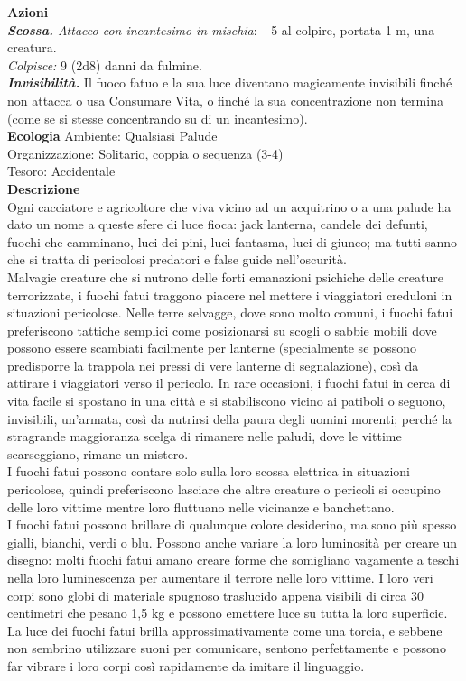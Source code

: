 \begin{multicols}{2}
\smallskip\textbf{Azioni}\\
\emph{\textbf{Scossa.} Attacco con incantesimo in mischia}: +5 al colpire, portata 1 m, una creatura.\\
\emph{Colpisce:} 9 (2d8) danni da fulmine.\\
\emph{\textbf{Invisibilità.}} Il fuoco fatuo e la sua luce diventano magicamente invisibili finché non attacca o usa Consumare Vita, o finché la sua concentrazione non termina (come se si stesse concentrando su di un incantesimo).\\
\textbf{Ecologia}
Ambiente: Qualsiasi Palude\\
Organizzazione: Solitario, coppia o sequenza (3-4)\\
Tesoro: Accidentale\\
\textbf{Descrizione}\\
Ogni cacciatore e agricoltore che viva vicino ad un acquitrino o a una palude ha dato un nome a queste sfere di luce fioca: jack lanterna, candele dei defunti, fuochi che camminano, luci dei pini, luci fantasma, luci di giunco; ma tutti sanno che si tratta di pericolosi predatori e false guide nell’oscurità.\\

Malvagie creature che si nutrono delle forti emanazioni psichiche delle creature terrorizzate, i fuochi fatui traggono piacere nel mettere i viaggiatori creduloni in situazioni pericolose. Nelle terre selvagge, dove sono molto comuni, i fuochi fatui preferiscono tattiche semplici come posizionarsi su scogli o sabbie mobili dove possono essere scambiati facilmente per lanterne (specialmente se possono predisporre la trappola nei pressi di vere lanterne di segnalazione), così da attirare i viaggiatori verso il pericolo. In rare occasioni, i fuochi fatui in cerca di vita facile si spostano in una città e si stabiliscono vicino ai patiboli o seguono, invisibili, un’armata, così da nutrirsi della paura degli uomini morenti; perché la stragrande maggioranza scelga di rimanere nelle paludi, dove le vittime scarseggiano, rimane un mistero.\\

I fuochi fatui possono contare solo sulla loro scossa elettrica in situazioni pericolose, quindi preferiscono lasciare che altre creature o pericoli si occupino delle loro vittime mentre loro fluttuano nelle vicinanze e banchettano.\\

I fuochi fatui possono brillare di qualunque colore desiderino, ma sono più spesso gialli, bianchi, verdi o blu. Possono anche variare la loro luminosità per creare un disegno: molti fuochi fatui amano creare forme che somigliano vagamente a teschi nella loro luminescenza per aumentare il terrore nelle loro vittime. I loro veri corpi sono globi di materiale spugnoso traslucido appena visibili di circa 30 centimetri che pesano 1,5 kg e possono emettere luce su tutta la loro superficie. La luce dei fuochi fatui brilla approssimativamente come una torcia, e sebbene non sembrino utilizzare suoni per comunicare, sentono perfettamente e possono far vibrare i loro corpi così rapidamente da imitare il linguaggio.\\


\end{multicols}
